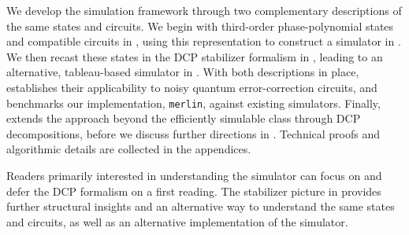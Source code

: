 We develop the simulation framework through two complementary descriptions of the same states and circuits.
We begin with third-order phase-polynomial states and compatible circuits in , using this representation to construct a simulator in .
We then recast these states in the DCP stabilizer formalism in , leading to an alternative, tableau-based simulator in .
With both descriptions in place,  establishes their applicability to noisy quantum error-correction circuits, and  benchmarks our implementation, \texttt{merlin}, against existing simulators.
Finally,  extends the approach beyond the efficiently simulable class through DCP decompositions, before we discuss further directions in .
Technical proofs and algorithmic details are collected in the appendices.

Readers primarily interested in understanding the simulator can focus on  and defer the DCP formalism on a first reading. The stabilizer picture in  provides further structural insights and an alternative way to understand the same states and circuits, as well as an alternative implementation of the simulator.
